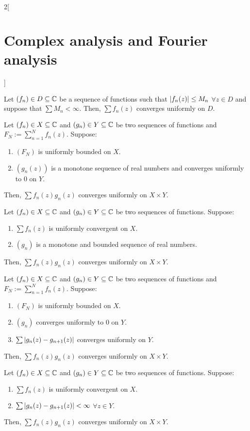 \documentclass[../../../main.tex]{subfiles}
\begin{document}
\begin{multicols}{2}[\section{Complex analysis and Fourier analysis}]
\begin{theorem}
    Let $(f_n)\in D\subseteq\mathbb{C}$ be a sequence of functions such that $\abs{f_n(z)}\leq M_n$ $\forall z\in D$ and suppose that $\sum M_n<\infty$. Then, $\sum f_n(z)$ converges uniformly on $D$.
  \end{theorem}
  \begin{theorem}
    Let $(f_n)\in X\subseteq \mathbb{C}$ and $(g_n)\in Y\subseteq \mathbb{C}$ be two sequences of functions and $F_N:=\sum_{n=1}^Nf_n(z)$. Suppose:
    \begin{enumerate}
      \item $(F_N)$ is uniformly bounded on $X$.
      \item $(g_n(z))$ is a monotone sequence of real numbers and converges uniformly to 0 on $Y$.
    \end{enumerate}
    Then, $\sum f_n(z)g_n(z)$ converges uniformly on $X\times Y$.
  \end{theorem}
  \begin{theorem}
    Let $(f_n)\in X\subseteq \mathbb{C}$ and $(g_n)\in Y\subseteq \mathbb{C}$ be two sequences of functions. Suppose:
    \begin{enumerate}
      \item $\sum f_n(z)$ is uniformly convergent on $X$.
      \item $(g_n)$ is a monotone and bounded sequence of real numbers.
    \end{enumerate}
    Then, $\sum f_n(z)g_n(z)$ converges uniformly on $X\times Y$.
  \end{theorem}
  \begin{theorem}
    Let $(f_n)\in X\subseteq \mathbb{C}$ and $(g_n)\in Y\subseteq \mathbb{C}$ be two sequences of functions and $F_N:=\sum_{n=1}^Nf_n(z)$. Suppose:
    \begin{enumerate}
      \item $(F_N)$ is uniformly bounded on $X$.
      \item $(g_n)$ converges uniformly to 0 on $Y$.
      \item $\sum\abs{g_n(z)-g_{n+1}(z)}$ converges uniformly on $Y$.
    \end{enumerate}
    Then, $\sum f_n(z)g_n(z)$ converges uniformly on $X\times Y$.
  \end{theorem}
  \begin{theorem}
    Let $(f_n)\in X\subseteq \mathbb{C}$ and $(g_n)\in Y\subseteq \mathbb{C}$ be two sequences of functions. Suppose:
    \begin{enumerate}
      \item $\sum f_n(z)$ is uniformly convergent on $X$.
      \item $\sum\abs{g_n(z)-g_{n+1}(z)}<\infty$ $\forall z\in Y$.
    \end{enumerate}
    Then, $\sum f_n(z)g_n(z)$ converges uniformly on $X\times Y$.
  \end{theorem}

\end{multicols}
\end{document}
